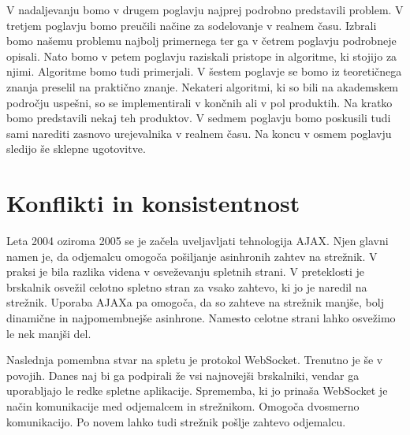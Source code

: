 \documentclass[a4paper, 12pt, twoside]{book}
\begin{document}
V nadaljevanju bomo v drugem poglavju najprej podrobno predstavili problem. V tretjem poglavju bomo preučili načine za sodelovanje v realnem času. Izbrali bomo našemu problemu najbolj primernega ter ga v četrem poglavju podrobneje opisali. Nato bomo v petem poglavju raziskali pristope in algoritme, ki stojijo za njimi. Algoritme bomo tudi primerjali. V šestem poglavje se bomo iz teoretičnega znanja preselil na praktično znanje. Nekateri algoritmi, ki so bili na akademskem področju uspešni, so se implementirali v končnih ali v pol produktih. Na kratko bomo predstavili nekaj teh produktov. V sedmem poglavju bomo poskusili tudi sami narediti zasnovo urejevalnika v realnem času. Na koncu v osmem poglavju sledijo še sklepne ugotovitve.

\chapter{Konflikti in konsistentnost}

Leta 2004 oziroma 2005 se je začela uveljavljati tehnologija AJAX. Njen glavni namen je, da odjemalcu omogoča pošiljanje asinhronih zahtev na strežnik. V praksi je bila razlika videna v osveževanju spletnih strani. V preteklosti je brskalnik osvežil celotno spletno stran za vsako zahtevo, ki jo je naredil na strežnik. Uporaba AJAXa pa omogoča, da so zahteve na strežnik manjše, bolj dinamične in najpomembnejše asinhrone. Namesto celotne strani lahko osvežimo le nek manjši del.

Naslednja pomembna stvar na spletu je protokol WebSocket. Trenutno je še v povojih. Danes naj bi ga podpirali že vsi najnovejši brskalniki, vendar ga uporabljajo le redke spletne aplikacije. Sprememba, ki jo prinaša WebSocket je način komunikacije med odjemalcem in strežnikom. Omogoča dvosmerno komunikacijo. Po novem lahko tudi strežnik pošlje zahtevo odjemalcu.
\end{document}
